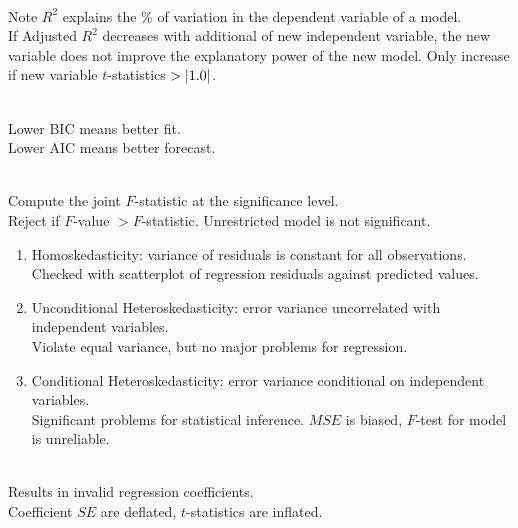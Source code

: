 \begin{definition} \\
Note $R^2$ explains the $\%$ of variation in the dependent variable of a model.\\
If Adjusted $R^2$ decreases with additional of new independent variable, the new variable does not improve the explanatory power of the new model. Only increase if new variable $t$-statistics $> \left\lvert1.0\right\rvert$.
\end{definition}

\begin{method} \\
Lower BIC means better fit.\\
Lower AIC means better forecast.
\end{method}

\begin{method} \\
Compute the joint $F$-statistic at the significance level.\\
Reject if $F$-value $> F$-statistic. Unrestricted model is not significant.
\end{method}

\begin{method} 
\begin{enumerate}[label=\roman*.]
\setlength{\itemsep}{0pt}
\item Homoskedasticity: variance of residuals is constant for all observations.\\
Checked with scatterplot of regression residuals against predicted values.
\item Unconditional Heteroskedasticity: error variance uncorrelated with independent variables.\\
Violate equal variance, but no major problems for regression.
\item Conditional Heteroskedasticity: error variance conditional on independent variables.\\
Significant problems for statistical inference. $MSE$ is biased, $F$-test for model is unreliable.
\end{enumerate}
\end{method}

\begin{method} \\
Results in invalid regression coefficients.\\
Coefficient $SE$ are deflated, $t$-statistics are inflated.
\end{method}

